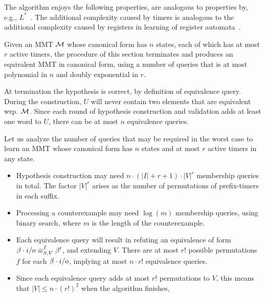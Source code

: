 The algorithm enjoys the following properties, are analogous
to properties by, e.g., $L^*$~\cite{Ang87}.
The additional complexity caused by timers is analogous
to the additional complexity caused by registers in learning of register
automata~\cite{HowarSJC12,CasselHJS16}.

\begin{theorem}
  \label{thm:alg:termination}
  Given an MMT ${\mathcal M}$ whose canonical form has $n$ states, each of which has
  at most $r$ active timers, the
  procedure of this section terminates and produces an equivalent MMT in
  canonical form, using a number of queries that is at most
  polynomial in $n$ and doubly exponential in $r$.
\end{theorem}

At termination the hypothesis is correct, by definition of equivalence query.
During the construction, $U$ will never contain two elements that are
equivalent wrp. ${\mathcal M}$.
Since each round of hypothesis construction and validation adds at least one
word to $U$, there can be at most $n$ equivalence queries.

Let us analyze the number of queries that may be required in the worst case
to learn an MMT whose canonical form has $n$ states and at most $r$ active
timers in any state.
\begin{itemize}
\item
  Hypothesis construction may need $n\cdot(|I|+r+1)\cdot |V|^r$
  membership queries in total. The factor $|V|^r$ arises as the number of
  permutations of prefix-timers in each suffix.
\item
  Processing a counterexample may need $\log(m)$ membership queries,
  using binary search, where $m$ is the length of the counterexample.
\item
  Each equivalence query will result in refuting an equivalence of form
  $\beta\cdot i/o \equiv_{S,V}^f \beta'$, and extending
   $V$. There are at most
  $r !$ possible permutations $f$ for each $\beta\cdot i/o$,
  implying at most $n \cdot r!$ equivalence queries.
\item Since each equivalence query adds at most $r!$ permutations
 to $V$, this means that $|V| \leq n\cdot(r!)^2$ when the algorithm finishes,
\end{itemize}



